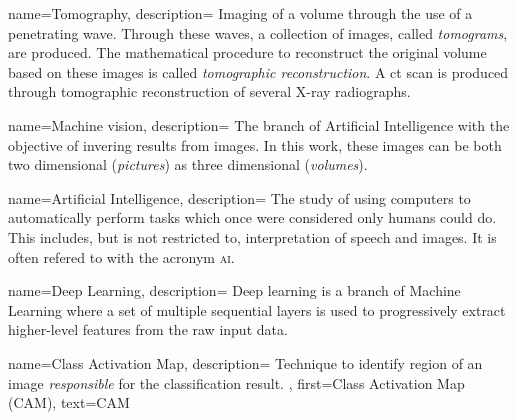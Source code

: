 {
        name={Tomography},
        description={
                Imaging of a volume through the use of a penetrating wave. 
                Through these waves, a collection of images, called \textit{tomograms}, are produced.
                The mathematical procedure to reconstruct the original volume based on these images is called \textit{tomographic reconstruction}.
                A \acrfull{ct} scan is produced through tomographic reconstruction of several X-ray radiographs.
                }
}

{
        name={Machine vision},
        description={
                The branch of Artificial Intelligence with the objective of invering results from images. 
                In this work, these images can be both two dimensional (\textit{pictures}) as three dimensional (\textit{volumes}).
                }
}

{
        name={Artificial Intelligence},
        description={
                The study of using computers to automatically perform tasks which once were considered only humans could do.
                This includes, but is not restricted to, interpretation of speech and images. It is often refered to with the acronym \textsc{ai}.
                }
}

{
        name={Deep Learning},
        description={
                Deep learning is a branch of Machine Learning where a set of multiple sequential layers is used to progressively extract higher-level features from the raw input data.
                }
}

{
        name={Class Activation Map},
        description={
                Technique to identify region of an image \textit{responsible} for the classification result.
        },
        first={Class Activation Map (CAM)},
        text={CAM}
}


